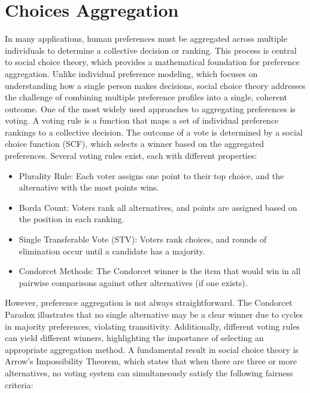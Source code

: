 \documentclass[
  letterpaper,
  numbers=noenddot,
  DIV=11]{scrreprt}
\providecommand{\tightlist}{%
  \setlength{\itemsep}{0pt}\setlength{\parskip}{0pt}}\usepackage{longtable,booktabs,array}
\theoremstyle{plain}
\theoremstyle{definition}
\theoremstyle{plain}
\theoremstyle{remark}
\begin{document}
\section{Choices Aggregation}\label{sec-choices-aggregation}

In many applications, human preferences must be aggregated across
multiple individuals to determine a collective decision or ranking. This
process is central to social choice theory, which provides a
mathematical foundation for preference aggregation. Unlike individual
preference modeling, which focuses on understanding how a single person
makes decisions, social choice theory addresses the challenge of
combining multiple preference profiles into a single, coherent outcome.
One of the most widely used approaches to aggregating preferences is
voting. A voting rule is a function that maps a set of individual
preference rankings to a collective decision. The outcome of a vote is
determined by a social choice function (SCF), which selects a winner
based on the aggregated preferences. Several voting rules exist, each
with different properties:

\begin{itemize}
\tightlist
\item
  Plurality Rule: Each voter assigns one point to their top choice, and
  the alternative with the most points wins.
\item
  Borda Count: Voters rank all alternatives, and points are assigned
  based on the position in each ranking.
\item
  Single Transferable Vote (STV): Voters rank choices, and rounds of
  elimination occur until a candidate has a majority.
\item
  Condorcet Methods: The Condorcet winner is the item that would win in
  all pairwise comparisons against other alternatives (if one exists).
\end{itemize}

However, preference aggregation is not always straightforward. The
Condorcet Paradox illustrates that no single alternative may be a clear
winner due to cycles in majority preferences, violating transitivity.
Additionally, different voting rules can yield different winners,
highlighting the importance of selecting an appropriate aggregation
method. A fundamental result in social choice theory is Arrow's
Impossibility Theorem, which states that when there are three or more
alternatives, no voting system can simultaneously satisfy the following
fairness criteria:
\end{document}
